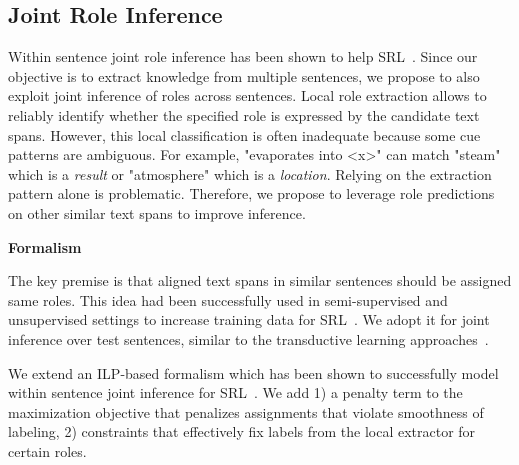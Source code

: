 
\subsection{Joint Role Inference}

Within sentence joint role inference has been shown to help SRL~\cite{punyakanok2004srl,koomen2005generalized}.
Since our objective is to extract knowledge from multiple sentences, we propose to also exploit joint inference of roles across sentences. Local role extraction allows to reliably identify whether the specified role is expressed by the candidate text spans. However, this local classification is often inadequate because some cue patterns are ambiguous. For example, "evaporates into <x>" can match "steam" which is a {\em result} or "atmosphere" which is a {\em location}. Relying on the extraction pattern alone is problematic. Therefore, we propose to leverage role predictions on other similar text spans to improve inference. 


{\bf Formalism}

The key premise is that aligned text spans in similar sentences should be assigned same roles. This idea had been successfully used in semi-supervised and unsupervised settings to increase training data for SRL~\cite{furstenau-emnlp2009,furstenau2012semi,lang-emnlp2011}. We adopt it for joint inference over test sentences, similar to the transductive learning approaches~\cite{?}.

We extend an ILP-based formalism which has been shown to successfully model within sentence joint inference for SRL~\cite{punyakanok2004srl}. We add 1) a penalty term to the maximization objective that penalizes assignments that violate smoothness of labeling, 2) constraints that effectively fix labels from the local extractor for certain roles. 

